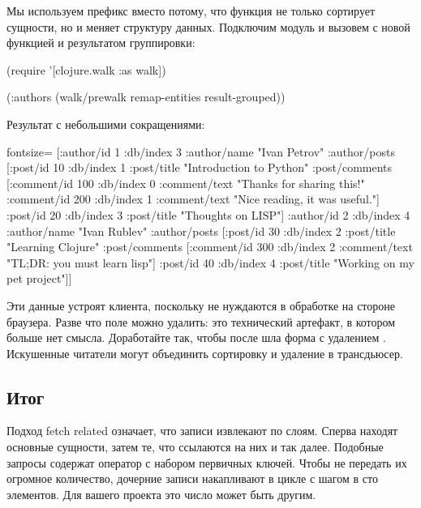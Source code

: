 Мы используем префикс  вместо  потому, что функция не только сортирует сущности, но и меняет структуру данных. Подключим модуль  и вызовем  с новой функцией и результатом группировки:

\begin{english}
  \begin{clojure}
(require '[clojure.walk :as walk])

(:authors
 (walk/prewalk remap-entities result-grouped))
  \end{clojure}
\end{english}

Результат с небольшими сокращениями:

\begin{english}
  \begin{clojure*}{fontsize=\small}
[{:author/id 1
  :db/index 3
  :author/name "Ivan Petrov"
  :author/posts
  [{:post/id 10
    :db/index 1
    :post/title "Introduction to Python"
    :post/comments
    [{:comment/id 100
      :db/index 0
      :comment/text "Thanks for sharing this!"}
     {:comment/id 200
      :db/index 1
      :comment/text "Nice reading, it was useful."}]}
   {:post/id 20
    :db/index 3
    :post/title "Thoughts on LISP"}]}
 {:author/id 2
  :db/index 4
  :author/name "Ivan Rublev"
  :author/posts
  [{:post/id 30
    :db/index 2
    :post/title "Learning Clojure"
    :post/comments
    [{:comment/id 300
      :db/index 2
      :comment/text "TL;DR: you must learn lisp"}]}
   {:post/id 40
    :db/index 4
    :post/title "Working on my pet project"}]}]
  \end{clojure*}
\end{english}

Эти данные устроят клиента, поскольку не нуждаются в обработке на стороне браузера. Разве что поле  можно удалить: это технический артефакт, в котором больше нет смысла. Доработайте  так, чтобы после  шла форма с удалением . Искушенные читатели могут объединить сортировку и удаление в трансдьюсер.

\subsection{Итог}

Подход fetch related означает, что записи извлекают по слоям. Сперва находят основные сущности, затем те, что ссылаются на них и так далее. Подобные запросы содержат оператор  с набором первичных ключей. Чтобы не передать их огромное количество, дочерние записи накапливают в цикле с шагом в сто элементов. Для вашего проекта это число может быть другим.

